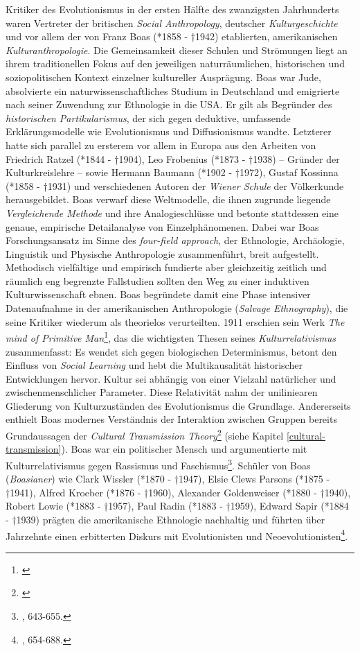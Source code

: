 \documentclass[openany,twoside,twocolumn]{book}
\let\rmarkdownfootnote\footnote%
\def\footnote{\protect\rmarkdownfootnote}
\begin{document}
Kritiker des Evolutionismus in der ersten Hälfte des zwanzigsten
Jahrhunderts waren Vertreter der britischen \emph{Social Anthropology},
deutscher \emph{Kulturgeschichte} und vor allem der von Franz Boas
(*1858 - †1942) etablierten, amerikanischen \emph{Kulturanthropologie}.
Die Gemeinsamkeit dieser Schulen und Strömungen liegt an ihrem
traditionellen Fokus auf den jeweiligen naturräumlichen, historischen
und soziopolitischen Kontext einzelner kultureller Ausprägung. Boas war
Jude, absolvierte ein naturwissenschaftliches Studium in Deutschland und
emigrierte nach seiner Zuwendung zur Ethnologie in die USA. Er gilt als
Begründer des \emph{historischen Partikularismus}, der sich gegen
deduktive, umfassende Erklärungsmodelle wie Evolutionismus und
Diffusionismus wandte. Letzterer hatte sich parallel zu ersterem vor
allem in Europa aus den Arbeiten von Friedrich Ratzel (*1844 - †1904),
Leo Frobenius (*1873 - †1938) -- Gründer der Kulturkreislehre -- sowie
Hermann Baumann (*1902 - †1972), Gustaf Kossinna (*1858 - †1931) und
verschiedenen Autoren der \emph{Wiener Schule} der Völkerkunde
herausgebildet. Boas verwarf diese Weltmodelle, die ihnen zugrunde
liegende \emph{Vergleichende Methode} und ihre Analogieschlüsse und
betonte stattdessen eine genaue, empirische Detailanalyse von
Einzelphänomenen. Dabei war Boas Forschungsansatz im Sinne des
\emph{four-field approach}, der Ethnologie, Archäologie, Linguistik und
Physische Anthropologie zusammenführt, breit aufgestellt. Methodisch
vielfältige und empirisch fundierte aber gleichzeitig zeitlich und
räumlich eng begrenzte Fallstudien sollten den Weg zu einer induktiven
Kulturwissenschaft ebnen. Boas begründete damit eine Phase intensiver
Datenaufnahme in der amerikanischen Anthropologie (\emph{Salvage
Ethnography}), die seine Kritiker wiederum als theorielos verurteilten.
1911 erschien sein Werk \emph{The mind of Primitive Man}\footnote{\textcite{Boasmindprimitiveman1911}},
das die wichtigsten Thesen seines \emph{Kulturrelativismus}
zusammenfasst: Es wendet sich gegen biologischen Determinismus, betont
den Einfluss von \emph{Social Learning} und hebt die Multikausalität
historischer Entwicklungen hervor. Kultur sei abhängig von einer
Vielzahl natürlicher und zwischenmenschlicher Parameter. Diese
Relativität nahm der uniliniearen Gliederung von Kulturzuständen des
Evolutionismus die Grundlage. Andererseits enthielt Boas modernes
Verständnis der Interaktion zwischen Gruppen bereits Grundaussagen der
\emph{Cultural Transmission Theory}\footnote{\textcite{obrien_epistemological_2002}}
(siehe Kapitel \ref{cultural-transmission}). Boas war ein politischer
Mensch und argumentierte mit Kulturrelativismus gegen Rassismus und
Faschismus\footnote{\textcite{petermann_geschichte_2004}, 643-655.}.
Schüler von Boas (\emph{Boasianer}) wie Clark Wissler (*1870 - †1947),
Elsie Clews Parsons (*1875 - †1941), Alfred Kroeber (*1876 - †1960),
Alexander Goldenweiser (*1880 - †1940), Robert Lowie (*1883 - †1957),
Paul Radin (*1883 - †1959), Edward Sapir (*1884 - †1939) prägten die
amerikanische Ethnologie nachhaltig und führten über Jahrzehnte einen
erbitterten Diskurs mit Evolutionisten und Neoevolutionisten\footnote{\textcite{petermann_geschichte_2004},
  654-688.}.
\end{document}
